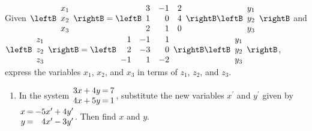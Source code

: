 \begin{multicols}{2}
\begin{ex}
\begin{sol}
\begin{enumerate}[label={\alph*.}]
\end{enumerate}
\end{sol}
\end{ex}

\begin{ex}
Given $\leftB \begin{array}{c}
x_{1} \\
x_{2} \\
x_{3}
\end{array} \rightB = \leftB \begin{array}{rrr}
3 & -1 & 2 \\
1 & 0 & 4 \\
2 & 1 & 0
\end{array} \rightB \leftB \begin{array}{c}
y_{1} \\
y_{2} \\
y_{3}
\end{array} \rightB$
 and $\leftB \begin{array}{c}
 z_{1} \\
 z_{2} \\
 z_{3}
 \end{array} \rightB = \leftB \begin{array}{rrr}
 1 & -1 & 1 \\
 2 & -3 & 0 \\
 -1 & 1 & -2
 \end{array} \rightB \leftB \begin{array}{c}
 y_{1} \\
 y_{2} \\
 y_{3}
 \end{array} \rightB$, express the variables $x_{1}$, $x_{2}$, and $x_{3}$ in terms of $z_{1}$, $z_{2}$, and $z_{3}$.
\end{ex}

\begin{ex}
\begin{enumerate}[label={\alph*.}]
\item In the system $\arraycolsep=1pt\begin{array}{rrrrr}
3x & + & 4y & = & 7 \\
4x & + & 5y & = & 1
\end{array}$, substitute the new variables $x^\prime$ and $y^\prime$ given by $\arraycolsep=1pt\begin{array}{rrrrr}
 x & = & -5x^\prime & + & 4y^\prime \\
 y & = & 4x^\prime & - & 3y^\prime
 \end{array}$. Then find $x$ and $y$.


\end{enumerate}
\end{ex}
\end{multicols}

